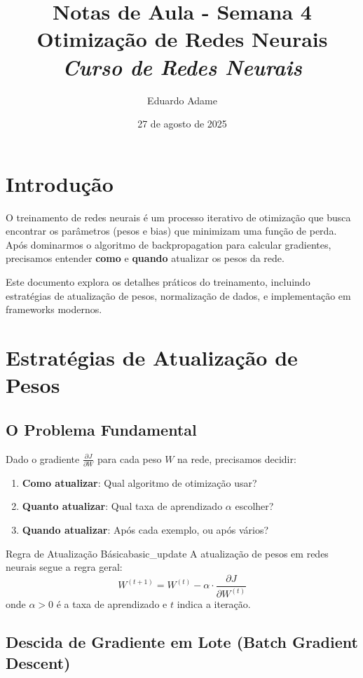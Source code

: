 \documentclass[a4paper,12pt]{article}
\title{Notas de Aula - Semana 4 \\
       \large Otimização de Redes Neurais\\
       \itshape Curso de Redes Neurais}
\author{Eduardo Adame}
\date{27 de agosto de 2025}
\newcommand{\highlight}[1]{{\color{nes_dark_orange}\textbf{#1}}}
\newcommand{\grad}[2]{\frac{\partial #1}{\partial #2}}
\begin{document}
\maketitle

\tableofcontents
\newpage

\section{Introdução}

O treinamento de redes neurais é um processo iterativo de otimização que busca encontrar os parâmetros (pesos e bias) que minimizam uma função de perda. Após dominarmos o algoritmo de backpropagation para calcular gradientes, precisamos entender \highlight{como} e \highlight{quando} atualizar os pesos da rede.

Este documento explora os detalhes práticos do treinamento, incluindo estratégias de atualização de pesos, normalização de dados, e implementação em frameworks modernos.

\section{Estratégias de Atualização de Pesos}

\subsection{O Problema Fundamental}

Dado o gradiente $\grad{J}{W}$ para cada peso $W$ na rede, precisamos decidir:
\begin{enumerate}
    \item \textbf{Como atualizar}: Qual algoritmo de otimização usar?
    \item \textbf{Quanto atualizar}: Qual taxa de aprendizado $\alpha$ escolher?
    \item \textbf{Quando atualizar}: Após cada exemplo, ou após vários?
\end{enumerate}

\begin{definicao}{Regra de Atualização Básica}{basic_update}
A atualização de pesos em redes neurais segue a regra geral:
\[
W^{(t+1)} = W^{(t)} - \alpha \cdot \grad{J}{W^{(t)}}
\]
onde $\alpha > 0$ é a taxa de aprendizado e $t$ indica a iteração.
\end{definicao}

\subsection{Descida de Gradiente em Lote (Batch Gradient Descent)}
\end{document}
